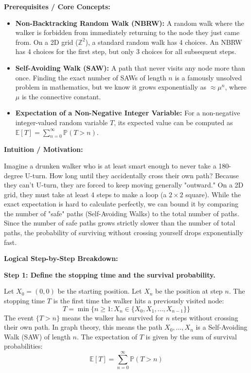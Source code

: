 \begin{solution}
\textbf{Prerequisites / Core Concepts:}
\begin{itemize}
    \item \textbf{Non-Backtracking Random Walk (NBRW):} A random walk where the walker is forbidden from immediately returning to the node they just came from. On a 2D grid ($\mathbb{Z}^2$), a standard random walk has 4 choices. An NBRW has 4 choices for the first step, but only 3 choices for all subsequent steps.
    \item \textbf{Self-Avoiding Walk (SAW):} A path that never visits any node more than once. Finding the exact number of SAWs of length $n$ is a famously unsolved problem in mathematics, but we know it grows exponentially as $\approx \mu^n$, where $\mu$ is the connective constant.
    \item \textbf{Expectation of a Non-Negative Integer Variable:} For a non-negative integer-valued random variable $T$, its expected value can be computed as $\mathbb{E}[T] = \sum_{n=0}^\infty \mathbb{P}(T > n)$.
\end{itemize}

\textbf{Intuition / Motivation:}

Imagine a drunken walker who is at least smart enough to never take a 180-degree U-turn. How long until they accidentally cross their own path? Because they can't U-turn, they are forced to keep moving generally "outward." On a 2D grid, they must take at least 4 steps to make a loop (a $2 \times 2$ square). While the exact expectation is hard to calculate perfectly, we can bound it by comparing the number of "safe" paths (Self-Avoiding Walks) to the total number of paths. Since the number of safe paths grows strictly slower than the number of total paths, the probability of surviving without crossing yourself drops exponentially fast.

\textbf{Logical Step-by-Step Breakdown:}

\textbf{Step 1: Define the stopping time and the survival probability.}

Let $X_0 = (0,0)$ be the starting position. Let $X_n$ be the position at step $n$.
The stopping time $T$ is the first time the walker hits a previously visited node:
\[ T = \min\{n \geq 1 : X_n \in \{X_0, X_1, \dots, X_{n-1}\}\} \]
The event $\{T > n\}$ means the walker has survived for $n$ steps without crossing their own path. In graph theory, this means the path $X_0, \dots, X_n$ is a Self-Avoiding Walk (SAW) of length $n$.
The expectation of $T$ is given by the sum of survival probabilities:
\[ \mathbb{E}[T] = \sum_{n=0}^\infty \mathbb{P}(T > n) \]


\end{solution}
